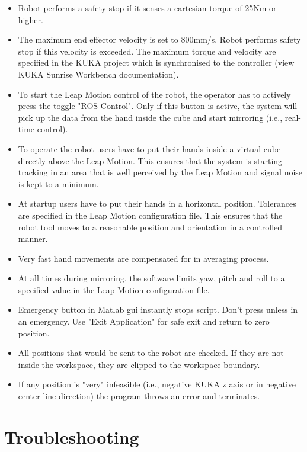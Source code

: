 \documentclass[headsepline,footinclude=false,fontsize=11pt,paper=a4,listof=totoc,bibliography=totoc,BCOR=12mm,DIV=14]{scrbook}
\begin{document}
\begin{itemize}
	\item Robot performs a safety stop if it senses a cartesian torque of 25Nm or higher.
	\item The maximum end effector velocity is set to 800mm/s. Robot performs safety stop if this velocity is exceeded. The maximum torque and velocity are specified in the KUKA project which is synchronised to the controller (view KUKA Sunrise Workbench documentation).
	\item To start the Leap Motion control of the robot, the operator has to actively press the toggle "ROS Control". Only if this button is active, the system will pick up the data from the hand inside the cube and start mirroring (i.e., real-time control).
	\item To operate the robot users have to put their hands inside a virtual cube directly above the Leap Motion. This ensures that the system is starting tracking in an area that is well perceived by the Leap Motion and signal noise is kept to a minimum.
	\item At startup users have to put their hands in a horizontal position. Tolerances are specified in the Leap Motion configuration file. This ensures that the robot tool moves to a reasonable position and orientation in a controlled manner.
	\item Very fast hand movements are compensated for in averaging process.
	\item At all times during mirroring, the software limits yaw, pitch and roll to a specified value in the Leap Motion configuration file.
	\item Emergency button in Matlab \gls{gui} instantly stops script. Don't press unless in an emergency. Use "Exit Application" for safe exit and return to zero position.
	\item All positions that would be sent to the robot are checked. If they are not inside the workspace, they are clipped to the workspace boundary.
	\item If any position is "very" infeasible (i.e., negative KUKA z axis or in negative center line direction) the program throws an error and terminates.
\end{itemize}

\newpage
\section{Troubleshooting}
\end{document}
